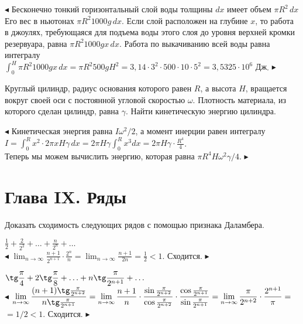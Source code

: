 \documentclass[a5paper,10pt]{article}
\begin{document}
\smallskip
\noindent $\blacktriangleleft$
Бесконечно тонкий горизонтальный слой воды толщины $dx$ имеет объем $\pi R^2\,dx$
Его вес в ньютонах $\pi R^2 1000g\,dx$. Если слой расположен на глубине $x$, то
работа в джоулях, требующаяся для подъема воды этого слоя до уровня верхней кромки
резервуара, равна $\pi R^2 1000gx\,dx$. Работа по выкачиванию всей воды равна
интегралу\\
$\displaystyle \int_0^H\pi R^2 1000gx\,dx=\pi R^2 500gH^2=
3{,}14\cdot 3^2\cdot500\cdot10\cdot5^2=
3{,}5325\cdot10^6\mbox{ Дж}$.
$\blacktriangleright$

\medskip
{} Круглый цилиндр, радиус основания которого
равен $R$, а высота $H$, вращается вокруг своей оси с постоянной
угловой скоростью $\omega$. Плотность материала, из которого
сделан цилиндр, равна $\gamma$. Найти кинетическую энергию цилиндра.

\smallskip
\noindent $\blacktriangleleft$
Кинетическая энергия равна $I\omega^2/2$, а момент инерции равен
интегралу\\
$I=\displaystyle \int_0^Rx^2\cdot2\pi xH\gamma\,dx=2\pi H\gamma\int_0^Rx^3dx=
2\pi H\gamma\cdot\frac{R^4}{4}$.\\
Теперь мы можем вычислить энергию, которая равна
$\pi R^4H\omega^2\gamma/4$. $\blacktriangleright$

\medskip
\section* {Глава IX. Ряды}

\medskip
\noindent Доказать сходимость следующих рядов с помощью признака Даламбера. 

\medskip
{} $\displaystyle\frac{1}{2}+\frac{2}{2^2}+\ldots+\frac{n}{2^n}+\ldots$\\
$\blacktriangleleft$ $\displaystyle\lim_{n\to\infty}\frac{n+1}{2^{n+1}}\cdot\frac{2^n}{n}=
\lim_{n\to\infty}\frac{n+1}{2n}=\frac12<1$. Сходится. $\blacktriangleright$

\medskip
{} $\displaystyle\tg\frac{\pi}{4}+2\tg\frac{\pi}{8}+
\ldots+n\tg\frac{\pi}{2^{n+1}}+\ldots$\\
$\blacktriangleleft$ $\displaystyle\lim_{n\to\infty}
\frac{(n+1)\tg\frac{\pi}{2^{n+2}}}{n\tg\frac{\pi}{2^{n+1}}}=
\lim_{n\to\infty}\frac{n+1}{n}\cdot
\frac{\sin\frac{\pi}{2^{n+2}}}{\cos\frac{\pi}{2^{n+2}}}\cdot
\frac{\cos\frac{\pi}{2^{n+1}}}{\sin\frac{\pi}{2^{n+1}}}=
\lim_{n\to\infty}\frac{\pi}{2^{n+2}}\cdot\frac{2^{n+1}}{\pi}=$\\
$\displaystyle =1/2<1$.
Сходится. $\blacktriangleright$
\end{document}
